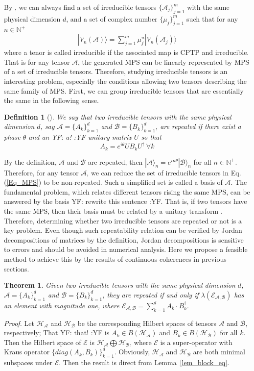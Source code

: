 \documentclass[journal]{IEEEtran}
\def\h{\ensuremath{\mathcal{H}}}
\def\a{\ensuremath{\mathcal{A}}}
\def\b{\ensuremath{\mathcal{B}}}
\def\e{\ensuremath{\mathcal{E}}}
\newtheorem{theorem}{Theorem}
\newtheorem{definition}{Definition}
\newcommand{\authorComment}[3]{\color{#1}#2: {#3} :#2\color{black}}
\newcommand{\yf}[1]{\authorComment{blue}{YF}{#1}}
\begin{document}
By \cite{cuevas2017irreducible}, we can always find a set of irreducible tensors $\{\a_{j}\}_{j=1}^{m}$ with the same physical dimension $d$, and a set of complex number $\{\mu_{j}\}_{j=1}^{m}$ such that for any $n\in\mathbb{N^{+}}$
\begin{eqnarray}\label{Eq_MPS}
  |V_n(\a)\rangle=\sum_{j=1}^{m}\mu_j^{n}|V_n(\a_{j})\rangle
\end{eqnarray}
where a tenor is called irreducible if the associated map is CPTP and irreducible. That is for any tensor $\a$,  the generated MPS can be linearly represented by MPS of a set of irreducible tensors. Therefore, studying irreducible tensors is an interesting problem, especially the conditions allowing two tensors describing the same family of
MPS.
First, we can group irreducible tensors that are essentially the same in the following sense.
\begin{definition}[\cite{cuevas2017irreducible}]
  We say that two irreducible tensors with the same physical dimension $d$, say $\a=\{A_{k}\}_{k=1}^{d}$ and $\b=\{B_{k}\}_{k=1}^{d}$, are repeated if there exist a phase $\theta$ and an \yf{a!} unitary matrix $U$ so that 
  $$A_{k}=e^{i\theta}UB_kU^\dagger \ \forall k$$
\end{definition}

By the definition, $\a$ and $\b$ are repeated, then $|\a\rangle_{n}=e^{in\theta}|\b\rangle_{n}$ for all $n\in \mathbb{N^+}$. Therefore, for any tensor $\a$, we can reduce the set of irreducible tensors  in Eq.(\ref{Eq_MPS}) to be non-repeated. Such a simplified set is called a basis of $\a$. The fundamental problem, which relates different tensors rising the same MPS, can be answered by the basis \yf{rewrite this sentence}. That is, if two tensors have the same MPS, then their basis must be related by a unitary transform \cite{cuevas2017irreducible}. Therefore, determining whether two irreducible tensors are  repeated or not  is a key problem. Even though such repeatability relation can be verified by Jordan decompositions of matrices by the definition, Jordan decompositions is sensitive to errors and should be avoided in numerical analysis. Here we propose a feasible method to achieve this by the results of continuous coherences in previous sections. 
\begin{theorem}
  Given two irreducible tensors with the same physical dimension $d$, $\a=\{A_{k}\}_{k=1}^{d}$ and $\b=\{B_{k}\}_{k=1}^{d}$, they are repeated if and only if $\lambda(\e_{\a,\b})$ has an element with magnitude one, where $\e_{\a,\b}=\sum_{k=1}^d A_{k}\cdot B_{k}^\dagger.$
\end{theorem}
{\it Proof.} Let $\h_\a$ and $\h_\b$ be the corresponding Hilbert spaces of tensors $\a$ and $\b$, respectively; That \yf{that!} is $A_k\in B(\h_\a)$ and $B_k\in B(\h_\b)$ for all $k$.  Then  the  Hilbert space of $\e$ is $\h_\a\bigoplus \h_\b$, where $\e$ is a super-operator with Kraus operator $\{diag(A_k,B_k)\}_{k=1}^d$. Obviously, $\h_\a$ and $\h_\b$ are both minimal subspaces under $\e$. Then the result is direct from Lemma~\ref{lem_block_eq}. 
\end{document}
